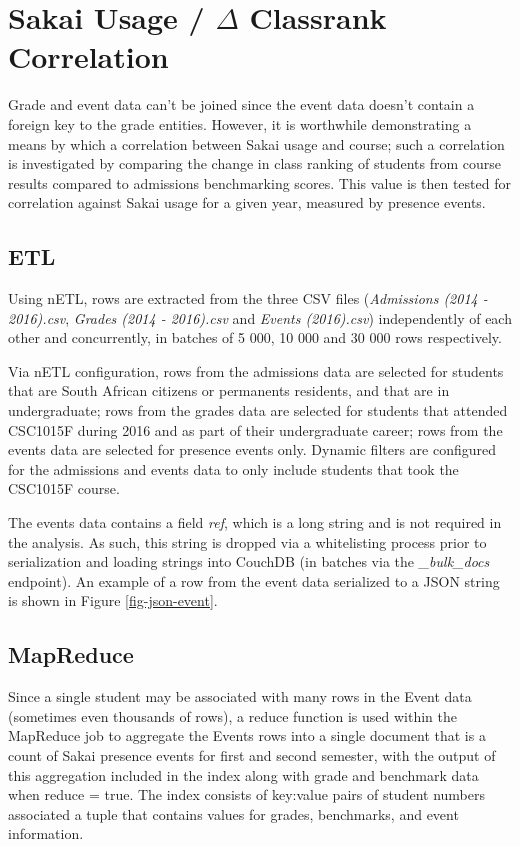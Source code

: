 \section{Sakai Usage / \texorpdfstring{$\Delta$}{Lg} Classrank Correlation}
Grade and event data can't be joined since the event data doesn't contain a foreign key to the grade entities. However, it is worthwhile demonstrating a means by which a correlation between Sakai usage and course; such a correlation is investigated by comparing the change in class ranking of students from course results compared to admissions benchmarking scores. This value is then tested for correlation against Sakai usage for a given year, measured by presence events.

\subsection{ETL}
Using nETL, rows are extracted from the three CSV files (\textit{Admissions (2014 - 2016).csv}, \textit{Grades (2014 - 2016).csv} and \textit{Events (2016).csv}) independently of each other and concurrently, in batches of 5 000, 10 000 and 30 000 rows respectively.

Via nETL configuration, rows from the admissions data are selected for students that are South African citizens or permanents residents, and that are in undergraduate; rows from the grades data are selected for students that attended CSC1015F during 2016 and as part of their undergraduate career; rows from the events data are selected for presence events only. Dynamic filters are configured for the admissions and events data to only include students that took the CSC1015F course.

The events data contains a field \textit{ref}, which is a long string and is not required in the analysis. As such, this string is dropped via a whitelisting process prior to serialization and loading strings into CouchDB (in batches via the \textit{\_bulk\_docs} endpoint). An example of a row from the event data serialized to a JSON string is shown in Figure \ref{fig-json-event}.



\subsection{MapReduce}
Since a single student may be associated with many rows in the Event data (sometimes even thousands of rows), a reduce function is used within the MapReduce job to aggregate the Events rows into a single document that is a count of Sakai presence events for first and second semester, with the output of this aggregation included in the index along with grade and benchmark data when reduce = true. The index consists of key:value pairs of student numbers associated a tuple that contains values for grades, benchmarks, and event information.

